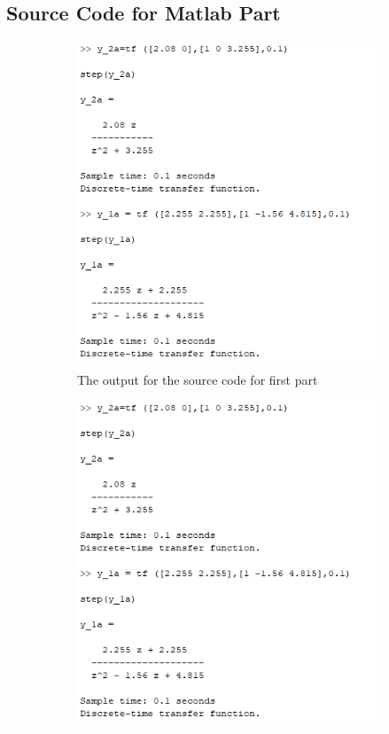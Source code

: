 \documentclass[a4paper,12pt]{article}
\begin{document}
\begin{appendices}
\section{Source Code for Matlab Part}\label{appendix}
 


\begin{figure}[H]
	\setlength{\unitlength}{\textwidth} 
	\centering
	\begin{subfigure}{.5\textwidth}
		\centering
		\includegraphics[width=.42\unitlength]{images/y1y2a}
		\caption{\label{fig:y1y2a} The output for the source code for first part}
	\end{subfigure}%
	\begin{subfigure}{.5\textwidth}
		\centering
		\includegraphics[width=.42\unitlength]{images/y1y2a}

\end{subfigure}
\end{figure}
\end{appendices}
\end{document}
